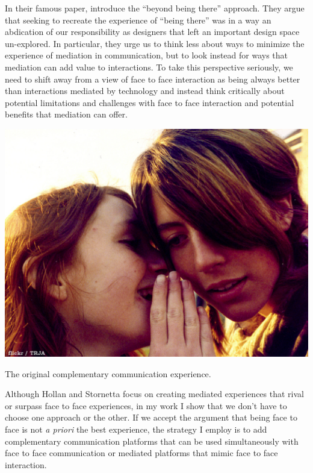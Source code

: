 In their famous paper, \citet{Hollan:1992tz} introduce the ``beyond being there'' approach. They argue that seeking to recreate the experience of ``being there'' was in a way an abdication of our responsibility as designers that left an important design space un-explored. In particular, they urge us to think less about ways to minimize the experience of mediation in communication, but to look instead for ways that mediation can add value to interactions. To take this perspective seriously, we need to shift away from a view of face to face interaction as being always better than interactions mediated by technology and instead think critically about potential limitations and challenges with face to face interaction and potential benefits that mediation can offer. 

\begin{marginfigure}
	\includegraphics{figures/whisper.png}
	\caption{The original complementary communication experience.}
	\label{fig:whisper}
\end{marginfigure}


Although Hollan and Stornetta focus on creating mediated experiences that rival or surpass face to face experiences, in my work I show that we don't have to choose one approach or the other. If we accept the argument that being face to face is not \emph{a priori} the best experience, the strategy I employ is to add complementary communication platforms that can be used simultaneously with face to face communication or mediated platforms that mimic face to face interaction.


